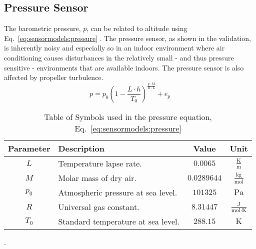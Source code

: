     \subsection{Pressure Sensor}
        The barometric pressure, $p$, can be related to altitude using Eq.~\eqref{eq:sensormodels:pressure} \cite{physicshandbook}.
        The pressure sensor, as shown in the validation, is inherently
        noisy and especially so in an indoor environment where air conditioning
        causes disturbances in the relatively small - and thus pressure sensitive -
        environments that are available indoors.
        The pressure sensor is also affected by propeller turbulence.
        \begin{equation}
            \label{eq:sensormodels:pressure}
            p = p_{0} \left( 1 - \frac{L \cdot h}{T_{0}} \right)^{\frac{g \cdot M}{R\cdot L}} + e_{p}
        \end{equation}
        \begin{table}
            \begin{tabularx}{\tablewidth}{|c|X|c|c|}\hline
                \textbf{Parameter} & \textbf{Description} & \textbf{Value} & \textbf{Unit} \\\hline
                $L$       & Temperature lapse rate.            & $0.0065$ & $\frac{\text{K}}{\text{m}}$ \\\hline
                $M$       & Molar mass of dry air.             & $0.0289644$ & $\frac{\text{kg}}{\text{mol}}$ \\\hline
                $p_{0}$   & Atmospheric pressure at sea level. & $101325$ & $\text{Pa}$ \\\hline
                $R$       & Universal gas constant.            & $8.31447$ & $\frac{\text{J}}{\text{mol} \cdot \text{K}}$ \\\hline
                $T_{0}$   & Standard temperature at sea level. & $288.15$ & $\text{K}$ \\\hline
            \end{tabularx}
            \label{tos:pressuresensor}
            \caption{Table of Symbols used in the pressure equation, Eq.~\eqref{eq:sensormodels:pressure}}.
        \end{table}

    
